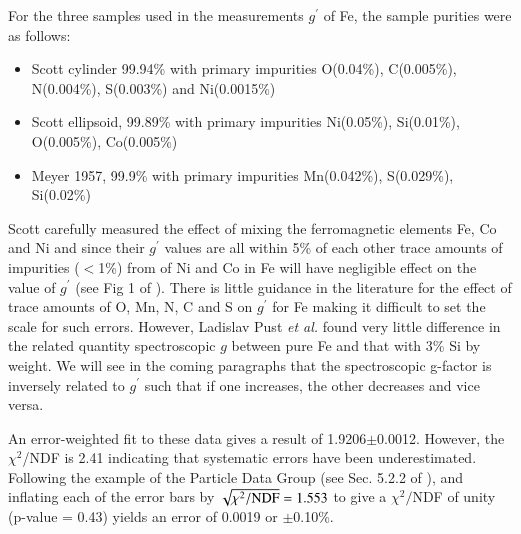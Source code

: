 \documentclass[preprint,12pt]{elsarticle}
\begin{document}
For the three samples used in the measurements $g^{\prime}$ of Fe, the sample purities were as follows: 
\begin{itemize}
\item{Scott cylinder 99.94\% with primary impurities O(0.04\%), C(0.005\%), N(0.004\%), S(0.003\%) and Ni(0.0015\%) \cite{Scott1951}}
\item{Scott ellipsoid, 99.89\% with primary impurities Ni(0.05\%), Si(0.01\%), O(0.005\%), Co(0.005\%) \cite{Scott1960}}
\item{ Meyer 1957, 99.9\% with primary impurities Mn(0.042\%), S(0.029\%), Si(0.02\%) \cite{Meyer1957}} 
\end{itemize}

Scott carefully measured the effect of mixing the ferromagnetic elements Fe, Co and Ni and since their $g^{\prime}$ values are all within 5\% of each other trace amounts of impurities ($<$1\%) from of Ni and Co in Fe will have negligible effect on the value of  $g^{\prime}$ (see Fig 1 of \cite{Scott1969}). There is little guidance in the literature for the effect of trace amounts of O, Mn, N, C and S on $g^{\prime}$ for Fe making it difficult to set the scale for such errors. However, Ladislav Pust {\it et al.} found very little difference in the related quantity spectroscopic $g$ between pure Fe and that with 3\% Si by weight\cite{Pust1984}. We will see in the coming paragraphs that the spectroscopic g-factor is inversely related to $g^{\prime}$ such that if one increases, the other decreases and vice versa. 

An error-weighted fit to these data gives a result of 1.9206$\pm$0.0012. However, the $\chi^2$/NDF is 2.41 indicating that systematic errors have been underestimated. Following the example of the Particle Data Group (see Sec. 5.2.2 of \cite{PDG2018}), and inflating each of the error bars by $\sqrt{\chi^2/{\rm NDF}}=1.553$ to give a $\chi^2/$NDF of unity (p-value = 0.43) yields an error of 0.0019 or $\pm$0.10\%.
\end{document}
